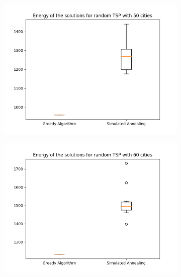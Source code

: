 \documentclass[14pt]
{article}
\begin{document}
\begin{figure}[H]
\centering
\begin{subfigure}{0.49\textwidth}
\centering
\includegraphics[width = \textwidth]{img/E50.png}
\end{subfigure}
\begin{subfigure}{0.49\textwidth}
\centering
\includegraphics[width = \textwidth]{img/E60.png}
\end{subfigure}
\begin{subfigure}{0.49\textwidth}
\centering

\end{subfigure}
\end{figure}
\end{document}
